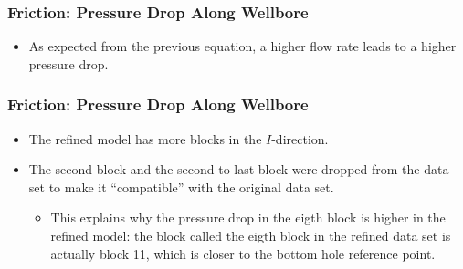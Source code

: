 \begin{frame}
    \frametitle{Friction: Pressure Drop Along Wellbore}
    \begin{itemize}
        \item As expected from the previous equation, a higher flow rate leads to a higher pressure drop.
    \end{itemize}
\end{frame}

\begin{frame}
    \frametitle{Friction: Pressure Drop Along Wellbore}
    \centerline{}
\end{frame}
\begin{frame}
    \begin{itemize}
        \item The refined model has more blocks in the $I$-direction.
        \item The second block and the second-to-last block were dropped from the data set to make it ``compatible'' with the original data set.
        \begin{itemize}
            \item This explains why the pressure drop in the eigth block is higher in the refined model: the block called the eigth block in the refined data set is actually block 11, which is closer to the bottom hole reference point.
        \end{itemize}
    \end{itemize}
\end{frame}
